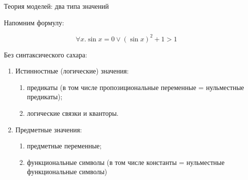 \documentclass[aspectratio=169]{beamer}
\begin{document}
\begin{frame}{Теория моделей: два типа значений}

Напомним формулу:\vspace{-0.3cm}

$$\forall x.\sin x = 0 \vee (\sin x)^2+1 > 1$$

Без синтаксического сахара:\vspace{-0.3cm}


\begin{enumerate}
\item {\color{blue}Истинностные (логические) значения: }

\begin{enumerate}
\item предикаты (в том числе пропозициональные переменные = нульместные предикаты);
\item логические связки и кванторы.
\end{enumerate}

\item {\color{red}Предметные значения:}

\begin{enumerate}
\item предметные переменные;
\item функциональные символы (в том числе константы = нульместные функциональные символы)
\end{enumerate}

\end{enumerate}
\end{frame}
\end{document}
